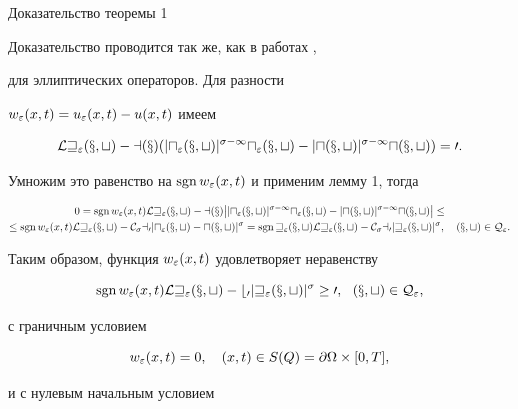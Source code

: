 \begin{pf*}{Доказательство теоремы 1}


Доказательство проводится так же, как в работах \cite{MP1},


\cite{MP2} для эллиптических операторов. Для разности


$w_\varepsilon(x,t)=u_\varepsilon(x,t)-u(x,t)$ имеем


$$


\cal{L}w_\eps(x,t)-a(x)


(|u_\eps(x,t)|^{\sigma-1}u_\eps(x,t)-|u(x,t)|^{\sigma-1}u(x,t))=0.


$$


Умножим это равенство на $\operatorname{sgn} w_\varepsilon(x,t)$ и применим лемму 1, тогда


\begin{gather*}


0=\sgn w_\eps(x,t)\cal{L}w_\eps(x,t)-a(x)


\big||u_\eps(x,t)|^{\sigma-1}u_\eps(x,t)-|u(x,t)|^{\sigma-1}u(x,t)\big|\le\\


%


\le\sgn w_\eps(x,t)\cal{L}w_\eps(x,t)-C_{\sigma}a_0|u_\eps(x,t)-u(x,t)|^\sigma=


\sgn w_\eps(x,t)\cal{L}w_\eps(x,t)-C_{\sigma}a_0|w_\eps(x,t)|^\sigma,


\quad (x,t)\in Q_\eps.


\end{gather*}


Таким образом, функция $w_\varepsilon(x,t)$ удовлетворяет неравенству


\begin{equation}


\sgn w_\eps(x,t)


\cal{L}w_\eps(x,t)-b_0|w_\eps(x,t)|^\sigma\ge0,\ \ (x,t)\in


Q_\eps, \label{nerlk}


\end{equation}


с граничным условием


\begin{equation}


w_\eps(x,t)=0,\quad (x,t)\in


S(Q)=\partial\Omega\times[0,T],\label{wo}


\end{equation}


и с нулевым начальным условием


\begin{equation}



\end{equation}
\end{pf*}
